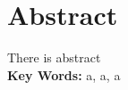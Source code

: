 \newpage
\thispagestyle{empty}
\section*{\textbf{} Abstract}
There is abstract\\
\textbf{Key Words: } a, a, a